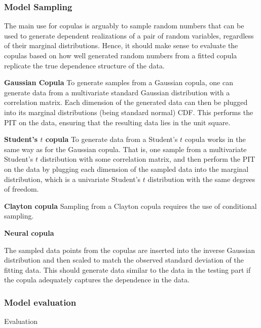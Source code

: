 \subsubsection{Model Sampling}
The main use for copulas is arguably to sample random numbers that can be used to generate dependent realizations of a pair of random variables, regardless of their marginal distributions. Hence, it should make sense to evaluate the copulas based on how well generated random numbers from a fitted copula replicate the true dependence structure of the data.  

\textbf{Gaussian Copula}
To generate samples from a Gaussian copula, one can generate data from a multivariate standard Gaussian distribution with a correlation matrix. Each dimension of the generated data can then be plugged into its marginal distributions (being standard normal) \gls{CDF}. This performs the \gls{PIT} on the data, ensuring that the resulting data lies in the unit square. 

\textbf{Student's $t$ copula} 
To generate data from a Student's $t$ copula works in the same way as for the Gaussian copula. That is, one sample from a multivariate Student's $t$ distribution with some correlation matrix, and then perform the \gls{PIT} on the data by plugging each dimension of the sampled data into the marginal distribution, which is a univariate Student's $t$ distribution with the same degrees of freedom. 

\textbf{Clayton copula}
Sampling from a Clayton copula requires the use of conditional sampling. 

\textbf{Neural copula}


The sampled data points from the copulas are inserted into the inverse Gaussian distribution and then scaled to match the observed standard deviation of the fitting data. This should generate data similar to the data in the testing part if the copula adequately captures the dependence in the data.

\subsubsection{Model evaluation}
Evaluation


